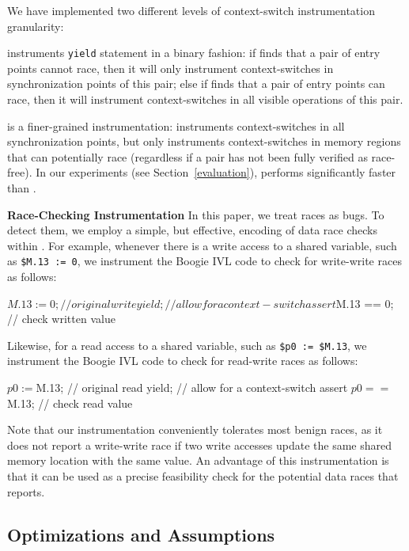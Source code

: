 We have implemented two different levels of context-switch instrumentation granularity:

\yieldcoarse instruments \texttt{yield} statement in a binary fashion: if \whoop
finds that a pair of entry points cannot race, then it will only instrument
context-switches in synchronization points of this pair; else if \whoop finds
that a pair of entry points can race, then it will instrument context-switches
in all visible operations of this pair.

\yieldmr is a finer-grained instrumentation: \whoop instruments context-switches
in all synchronization points, but only instruments context-switches in memory
regions that can potentially race (regardless if a pair has not been fully
verified as race-free). In our experiments (see Section~\ref{evaluation}),
\yieldmr performs significantly faster than \yieldcoarse.

\noindent
\textbf{Race-Checking Instrumentation}\xspace\xspace In this paper, we treat races as bugs. To detect them, we employ a simple, but effective, encoding of data race checks within \corral.
For example, whenever there is a write access to a shared variable, such as
\texttt{\$M.13 := 0}, we instrument the Boogie IVL code to check for write-write
races as follows:
%
\begin{boogie}
$M.13 := 0;        // original write
yield;             // allow for a context-switch
assert $M.13 == 0; // check written value
\end{boogie}
%
Likewise, for a read access to a shared variable, such as \texttt{\$p0 :=
\$M.13}, we instrument the Boogie IVL code to check for read-write races as
follows:
%
\begin{boogie}
$p0 := $M.13;        // original read
yield;               // allow for a context-switch
assert $p0 == $M.13; // check read value
\end{boogie}

Note that our instrumentation conveniently tolerates most benign races, as it does not report a write-write race if two write accesses update the same shared memory location with the same value.  An advantage of this instrumentation is that it can be used as a precise feasibility check for the potential data races that \whoop reports.

\subsection{Optimizations and Assumptions}
\label{whoop:optimizations}

